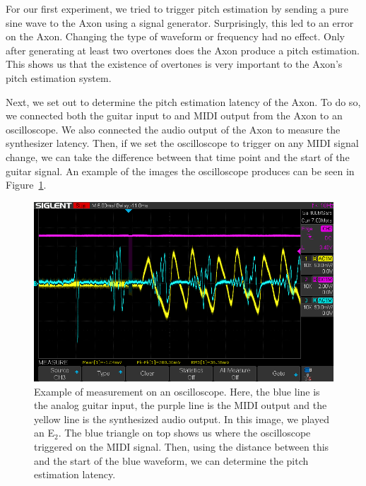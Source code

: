 \documentclass[a4paper,10pt,twocolumn]{article}
\newcommand{\note}[2]{#1${}_{#2}$}
\begin{document}
For our first experiment, we tried to trigger pitch estimation by sending a pure sine wave to the Axon using a signal generator. Surprisingly, this led to an error on the Axon. Changing the type of waveform or frequency had no effect. Only after generating at least two overtones does the Axon produce a pitch estimation. This shows us that the existence of overtones is very important to the Axon's pitch estimation system.

Next, we set out to determine the pitch estimation latency of the Axon. To do so, we connected both the guitar input to and MIDI output from the Axon to an oscilloscope. We also connected the audio output of the Axon to measure the synthesizer latency. %
Then, if we set the oscilloscope to trigger on any MIDI signal change, we can take the difference between that time point and the start of the guitar signal. An example of the images the oscilloscope produces can be seen in Figure~\ref{fig:osc_overview}.
\begin{figure}[t]
    \centering
    \includegraphics[width=\linewidth]{fig/osc_1.png}
    \caption{Example of measurement on an oscilloscope. Here, the blue line is the analog guitar input, the purple line is the MIDI output and the yellow line is the synthesized audio output. In this image, we played an \note{E}{2}. The blue triangle on top shows us where the oscilloscope triggered on the MIDI signal. Then, using the distance between this and the start of the blue waveform, we can determine the pitch estimation latency.}
    \label{fig:osc_overview}
\end{figure}
\end{document}
